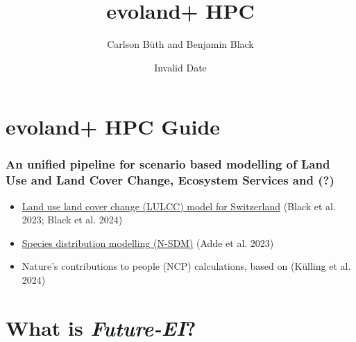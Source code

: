\documentclass[
  letterpaper,
  DIV=11,
  numbers=noendperiod]{scrreprt}
\title{evoland+ HPC}
\author{Carlson Büth and Benjamin Black}
\date{Invalid Date}
\providecommand{\tightlist}{%
  \setlength{\itemsep}{0pt}\setlength{\parskip}{0pt}}\usepackage{longtable,booktabs,array}
\renewcommand*\contentsname{Table of contents}
\newcommand\contentsname{Table of contents}
\begin{document}
\maketitle

\renewcommand*\contentsname{Table of contents}
{
\hypersetup{linkcolor=}
\setcounter{tocdepth}{2}
\tableofcontents
}


\chapter*{evoland+ HPC Guide}\label{evoland-hpc-guide}


\label{about}

\newpage{}

\subsection*{An unified pipeline for scenario based modelling of Land
Use and Land Cover Change, Ecosystem Services and
(?)}\label{an-unified-pipeline-for-scenario-based-modelling-of-land-use-and-land-cover-change-ecosystem-services-and}

\begin{itemize}
\tightlist
\item
  \href{https://github.com/blenback/LULCC-CH}{Land use land cover change
  (LULCC) model for Switzerland} (Black et al. 2023; Black et al. 2024)
\item
  \href{https://github.com/N-SDM/N-SDM}{Species distribution modelling
  (N-SDM)} (Adde et al. 2023)
\item
  Nature's contributions to people (NCP) calculations, based on (Külling
  et al. 2024)
\end{itemize}


\chapter*{\texorpdfstring{What is
\emph{Future-EI}?}{What is Future-EI?}}\label{what-is-future-ei}

\end{document}
